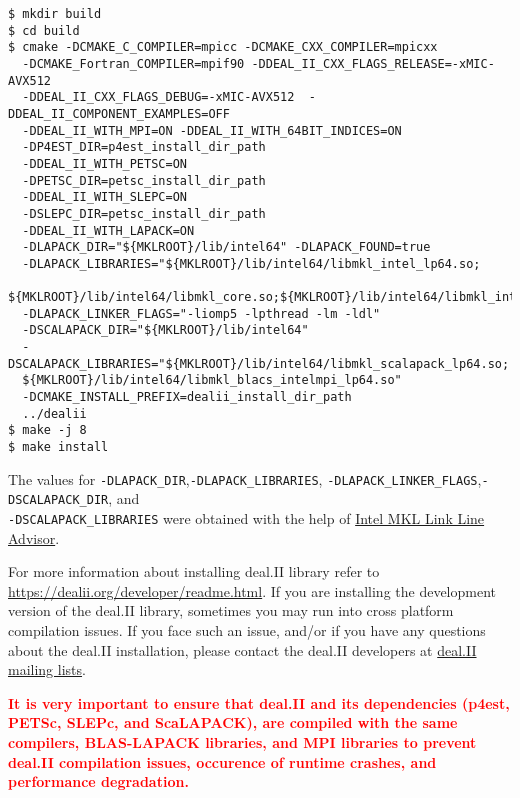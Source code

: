 \begin{verbatim}
$ mkdir build
$ cd build
$ cmake -DCMAKE_C_COMPILER=mpicc -DCMAKE_CXX_COMPILER=mpicxx 
  -DCMAKE_Fortran_COMPILER=mpif90 -DDEAL_II_CXX_FLAGS_RELEASE=-xMIC-AVX512 
  -DDEAL_II_CXX_FLAGS_DEBUG=-xMIC-AVX512  -DDEAL_II_COMPONENT_EXAMPLES=OFF
  -DDEAL_II_WITH_MPI=ON -DDEAL_II_WITH_64BIT_INDICES=ON
  -DP4EST_DIR=p4est_install_dir_path
  -DDEAL_II_WITH_PETSC=ON 
  -DPETSC_DIR=petsc_install_dir_path
  -DDEAL_II_WITH_SLEPC=ON
  -DSLEPC_DIR=petsc_install_dir_path
  -DDEAL_II_WITH_LAPACK=ON
  -DLAPACK_DIR="${MKLROOT}/lib/intel64" -DLAPACK_FOUND=true
  -DLAPACK_LIBRARIES="${MKLROOT}/lib/intel64/libmkl_intel_lp64.so;
  ${MKLROOT}/lib/intel64/libmkl_core.so;${MKLROOT}/lib/intel64/libmkl_intel_thread.so" 
  -DLAPACK_LINKER_FLAGS="-liomp5 -lpthread -lm -ldl"
  -DSCALAPACK_DIR="${MKLROOT}/lib/intel64"
  -DSCALAPACK_LIBRARIES="${MKLROOT}/lib/intel64/libmkl_scalapack_lp64.so;
  ${MKLROOT}/lib/intel64/libmkl_blacs_intelmpi_lp64.so"
  -DCMAKE_INSTALL_PREFIX=dealii_install_dir_path
  ../dealii
$ make -j 8
$ make install
\end{verbatim}
The values for \verb|-DLAPACK_DIR|,\verb|-DLAPACK_LIBRARIES|, \verb|-DLAPACK_LINKER_FLAGS|,\verb|-DSCALAPACK_DIR|, and\\ \verb|-DSCALAPACK_LIBRARIES| were obtained with the help of \href{https://software.intel.com/en-us/articles/intel-mkl-link-line-advisor}{Intel MKL Link Line Advisor}. 

For more information about installing deal.II library refer to \url{https://dealii.org/developer/readme.html}. If you are installing the development version of the deal.II library, sometimes you may run into cross platform compilation issues.  If you face such an issue, and/or if you have any questions about the deal.II installation, please contact the deal.II developers at \href{https://groups.google.com/d/forum/dealii}{deal.II mailing lists}.

\textcolor{red}{\bf It is  very important to ensure that deal.II and its dependencies (p4est, PETSc, SLEPc, and ScaLAPACK), are compiled with the same compilers, BLAS-LAPACK libraries, and MPI libraries to prevent deal.II compilation issues, occurence of runtime crashes, and \dftfe{} performance degradation.}  


